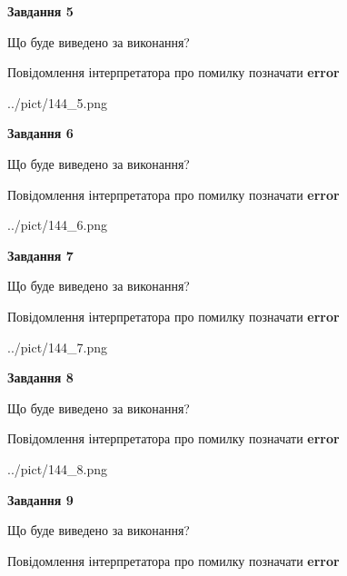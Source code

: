 \documentclass[11pt, ukrainian]{article}
\begin{document}
{\begin {large}
{\begin {center}\textbf{Завдання 5}\end {center}}\par
Що буде виведено за виконання? \par
Повідомлення інтерпретатора про помилку позначати \textbf{error}

\begin{center}
	{../pict/144_5.png}
\end{center}
\newpage

{\begin {center}\textbf{Завдання 6}\end {center}}\par
Що буде виведено за виконання? \par
Повідомлення інтерпретатора про помилку позначати \textbf{error}

\begin{center}
	{../pict/144_6.png}
\end{center}
\newpage

{\begin {center}\textbf{Завдання 7}\end {center}}\par
Що буде виведено за виконання? \par
Повідомлення інтерпретатора про помилку позначати \textbf{error}

\begin{center}
	{../pict/144_7.png}
\end{center}
\newpage

{\begin {center}\textbf{Завдання 8}\end {center}}\par
Що буде виведено за виконання? \par
Повідомлення інтерпретатора про помилку позначати \textbf{error}

\begin{center}
	{../pict/144_8.png}
\end{center}
\newpage

{\begin {center}\textbf{Завдання 9}\end {center}}\par
Що буде виведено за виконання? \par
Повідомлення інтерпретатора про помилку позначати \textbf{error}


\end{large}}
\end{document}
